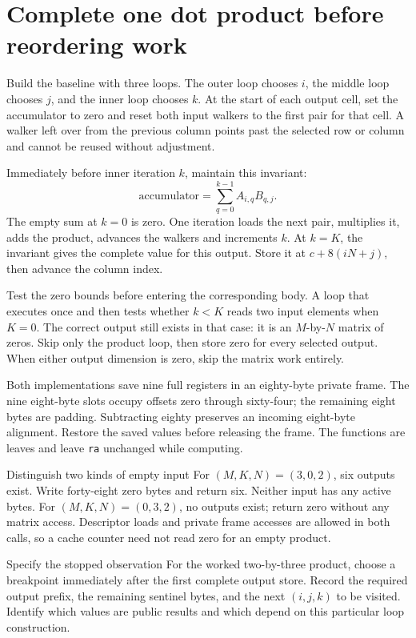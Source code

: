 \section{Complete one dot product before reordering work}
Build the baseline with three loops. The outer loop chooses \(i\), the middle
loop chooses \(j\), and the inner loop chooses \(k\). At the start of each
output cell, set the accumulator to zero and reset both input walkers to the first
pair for that cell. A walker left over from the previous column points past the
selected row or column and cannot be reused without adjustment.

Immediately before inner iteration \(k\), maintain this invariant:
\[
 \text{accumulator}=\sum_{q=0}^{k-1}A_{i,q}B_{q,j}.
\]
The empty sum at \(k=0\) is zero. One iteration loads the next pair, multiplies
it, adds the product, advances the walkers and increments \(k\). At \(k=K\),
the invariant gives the complete value for this output. Store it at
\(c+8(iN+j)\), then advance the column index.

Test the zero bounds before entering the corresponding body. A loop that executes
once and then tests whether \(k<K\) reads two input elements when \(K=0\).
The correct output still exists in that case: it is an \(M\)-by-\(N\) matrix
of zeros. Skip only the product loop, then store zero for every selected output.
When either output dimension is zero, skip the matrix work entirely.

Both implementations save nine full registers in an eighty-byte private frame.
The nine eight-byte slots occupy offsets zero through sixty-four; the remaining
eight bytes are padding. Subtracting eighty preserves an incoming eight-byte
alignment. Restore the saved values before releasing the frame. The functions are
leaves and leave \texttt{ra} unchanged while computing.

\begin{MARSWorkedExample}{Distinguish two kinds of empty input}
For \((M,K,N)=(3,0,2)\), six outputs exist. Write forty-eight zero bytes and return
six. Neither input has any active bytes. For \((M,K,N)=(0,3,2)\), no outputs exist;
return zero without any matrix access. Descriptor loads and private frame accesses
are allowed in both calls, so a cache counter need not read zero for an empty product.
\end{MARSWorkedExample}

\begin{MARSExercise}{Specify the stopped observation}
For the worked two-by-three product, choose a breakpoint immediately after the
first complete output store. Record the required output prefix, the remaining
sentinel bytes, and the next \((i,j,k)\) to be visited. Identify which values are
public results and which depend on this particular loop construction.
\end{MARSExercise}
